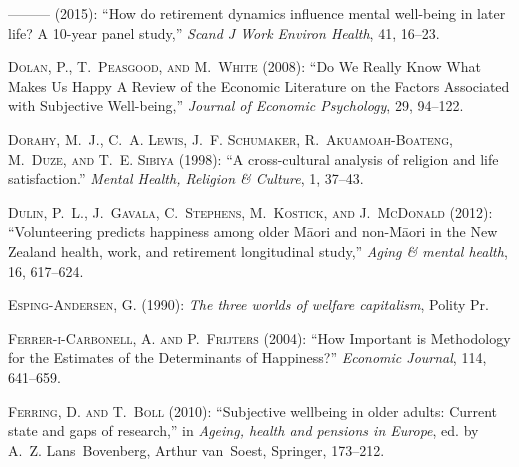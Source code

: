 \documentclass[10pt, letterpaper]{article}
\begin{document}
\begin{spacing}{1.4}
\begin{thebibliography}{71}
---\hspace{-.1pt}---\hspace{-.1pt}--- (2015): \enquote{How do retirement
  dynamics influence mental well-being in later life? A 10-year panel study,}
  \emph{Scand J Work Environ Health}, 41, 16--23.

\textsc{Dolan, P., T.~Peasgood, and M.~White} (2008): \enquote{Do We Really
  Know What Makes Us Happy A Review of the Economic Literature on the Factors
  Associated with Subjective Well-being,} \emph{Journal of Economic
  Psychology}, 29, 94--122.

\textsc{Dorahy, M.~J., C.~A. Lewis, J.~F. Schumaker, R.~Akuamoah-Boateng,
  M.~Duze, and T.~E. Sibiya} (1998): \enquote{A cross-cultural analysis of
  religion and life satisfaction.} \emph{Mental Health, Religion \& Culture},
  1, 37--43.

\textsc{Dulin, P.~L., J.~Gavala, C.~Stephens, M.~Kostick, and J.~McDonald}
  (2012): \enquote{Volunteering predicts happiness among older M{\=a}ori and
  non-M{\=a}ori in the New Zealand health, work, and retirement longitudinal
  study,} \emph{Aging \& mental health}, 16, 617--624.

\textsc{Esping-Andersen, G.} (1990): \emph{{The three worlds of welfare
  capitalism}}, Polity Pr.

\textsc{{Ferrer-i-Carbonell}, A. and P.~Frijters} (2004): \enquote{How
  Important is Methodology for the Estimates of the Determinants of Happiness?}
  \emph{Economic Journal}, 114, 641--659.

\textsc{Ferring, D. and T.~Boll} (2010): \enquote{Subjective wellbeing in older
  adults: Current state and gaps of research,} in \emph{Ageing, health and
  pensions in Europe}, ed. by A.~Z. Lans~Bovenberg, Arthur van~Soest, Springer,
  173--212.


\end{thebibliography}
\end{spacing}
\end{document}
